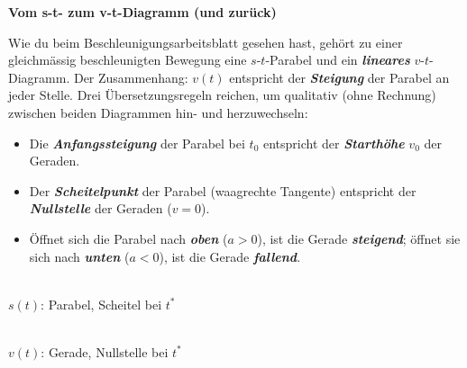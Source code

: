 \documentclass[addpoints,11pt,a4paper]{exam}
\newenvironment{theoriebox}[1][Theorie]{%
  \par\addvspace{10pt}\noindent\textbf{#1}\par\smallskip\noindent
}{%
  \par\addvspace{10pt}
}
\begin{document}
\begin{theoriebox}[Vom s-t- zum v-t-Diagramm (und zurück)]
Wie du beim Beschleunigungsarbeitsblatt gesehen hast, gehört zu einer
gleichmässig beschleunigten Bewegung eine $s$-$t$-Parabel und ein
\textbf{\emph{lineares}} $v$-$t$-Diagramm. Der Zusammenhang: $v(t)$
entspricht der \textbf{\emph{Steigung}} der Parabel an jeder Stelle. Drei
Übersetzungsregeln reichen, um qualitativ (ohne Rechnung) zwischen beiden
Diagrammen hin- und herzuwechseln:
\begin{itemize}[leftmargin=1.2cm,itemsep=0.25em]
  \item Die \textbf{\emph{Anfangssteigung}} der Parabel bei $t_0$ entspricht der \textbf{\emph{Starthöhe}} $v_0$ der Geraden.
  \item Der \textbf{\emph{Scheitelpunkt}} der Parabel (waagrechte Tangente) entspricht der \textbf{\emph{Nullstelle}} der Geraden ($v=0$).
  \item Öffnet sich die Parabel nach \textbf{\emph{oben}} ($a>0$), ist die Gerade \textbf{\emph{steigend}}; öffnet sie sich nach \textbf{\emph{unten}} ($a<0$), ist die Gerade \textbf{\emph{fallend}}.
\end{itemize}

\begin{center}
\begin{minipage}{0.47\linewidth}\centering
{}\\[-0.2em]
{\scriptsize $s(t)$: Parabel, Scheitel bei $t^\ast$}
\end{minipage}\hfill
\begin{minipage}{0.47\linewidth}\centering
{}\\[-0.2em]
{\scriptsize $v(t)$: Gerade, Nullstelle bei $t^\ast$}
\end{minipage}
\end{center}
\end{theoriebox}
\end{document}
